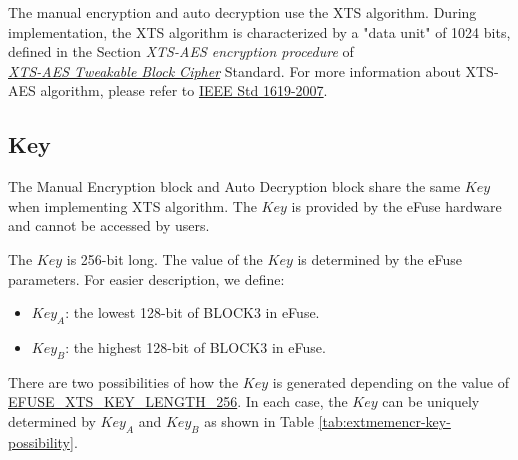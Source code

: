 \documentclass[main\_\_EN.tex]{subfiles}
\begin{document}
The manual encryption and auto decryption use the XTS algorithm. During implementation, the XTS algorithm is characterized by a "data unit" of 1024 bits, defined in the Section \textit{XTS-AES encryption procedure} of \\ \href{https://ieeexplore.ieee.org/document/4493450}{\textit{XTS-AES Tweakable Block Cipher}} Standard. For more information about XTS-AES algorithm, please refer to \href{https://ieeexplore.ieee.org/document/4493450}{IEEE Std 1619-2007}.

\subsection{Key}
\label{sec:extmemncr-key}

The Manual Encryption block and Auto Decryption block share the same \begin{math}Key\end{math} when implementing XTS algorithm. The \begin{math}Key\end{math} is provided by the eFuse hardware and cannot be accessed by users.

The \begin{math}Key\end{math} is 256-bit long. The value of the \begin{math}Key\end{math} is determined by the eFuse parameters. For easier description, we define:

\begin{itemize}
\item \begin{math}Key_{A}\end{math}: the lowest 128-bit of BLOCK3 in eFuse.
\item \begin{math}Key_{B}\end{math}: the highest 128-bit of BLOCK3 in eFuse.
\end{itemize}


There are two possibilities of how the \begin{math}Key\end{math} is generated depending on the value of \hyperref[fielddesc:EFUSEXTSKEYLENGTH256]{EFUSE\_XTS\_KEY\_LENGTH\_256}. In each case, the \begin{math}Key\end{math} can be uniquely determined by \begin{math}Key_{A}\end{math} and \begin{math}Key_{B}\end{math} as shown in Table \ref{tab:extmemencr-key-possibility}.
\end{document}
